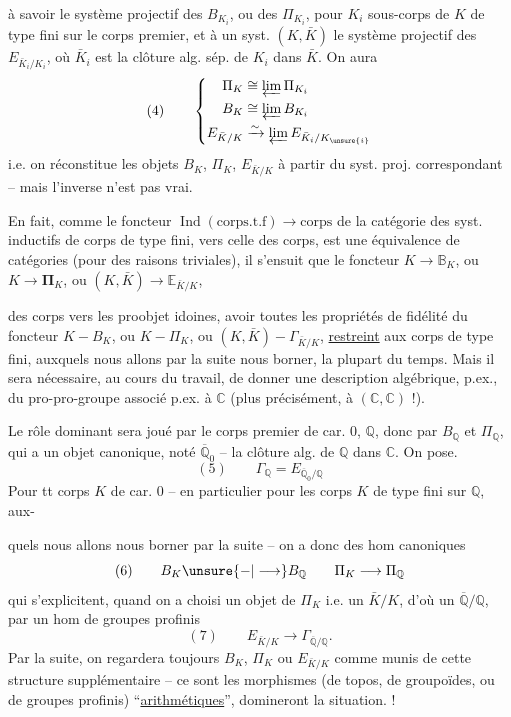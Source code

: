 à savoir le système projectif des $B_{K_i}$, ou des $\Pi_{K_i}$, pour $K_i$ sous-corps de $K$ de type fini sur le corps premier, et à un syst. $(K,\bar K)$ le système projectif des $E_{\bar K_i/K_i}$, où $\bar K_i$ est la clôture alg. sép. de $K_i$ dans $\bar K$. On aura
\[
(4)\qquad\left\{\begin{aligned}
\Pi_K&\cong\varprojlim\Pi_{K_i}\\
B_K&\cong\varprojlim B_{K_i}\\
E_{\bar K/K}&\xrightarrow{\sim}\varprojlim E_{\bar K_i/K_{\unsure{i}}}
\end{aligned}\right.
\]
i.e. on réconstitue les objets $B_K$, $\Pi_K$, $E_{\bar K/K}$ à partir du syst. proj. correspondant -- mais l'inverse n'est pas vrai.

En fait, comme le foncteur $\operatorname{Ind}(\text{corps.t.f})\longrightarrow\text{corps}$ de la catégorie des syst. inductifs de corps de type fini, vers celle des corps, est une équivalence de catégories (pour des raisons triviales), il s'ensuit que le foncteur $K\longrightarrow\mathbb{B}_K$, ou $K\longrightarrow\boldsymbol{\Pi}_K$, ou $(K,\bar K)\longrightarrow\mathbb{E}_{\bar K/K}$, 

des corps vers les proobjet idoines,  avoir toutes les propriétés de fidélité du foncteur $K-B_K$, ou $K-\Pi_K$, ou $(K,\bar K)-\Gamma_{\bar K/K}$, \uline{restreint} aux corps  de type fini, auxquels nous allons par la suite nous borner, la plupart du temps. Mais il sera nécessaire, au cours du travail, de donner une description  algébrique, p.ex., du pro-pro-groupe  associé p.ex. à $\mathbb C$ (plus précisément, à $(\mathbb C,\mathbb C)$ !).

Le rôle dominant sera joué par le corps premier de car. $0$, $\mathbb Q$, donc par $B_{\mathbb Q}$ et $\Pi_{\mathbb Q}$, qui a un objet canonique, noté $\overline{\mathbb Q}_0$ -- la clôture alg. de $\mathbb Q$ dans $\mathbb C$. On pose.
\[
(5)\qquad \Gamma_{\mathbb Q}=E_{\overline{\mathbb Q}_0/\mathbb Q}
\]
Pour tt corps $K$ de car. $0$ -- en particulier pour les corps $K$ de type fini sur $\mathbb Q$, aux-

quels nous allons nous borner par la suite -- on a donc des hom canoniques
\[
(6)\qquad B_K\unsure{-|\longrightarrow}B_{\mathbb Q}\qquad\Pi_K\longrightarrow\Pi_{\mathbb Q}
\]
qui s'explicitent, quand on a choisi un objet de $\Pi_K$ i.e. un $\bar K/K$, d'où un $\overline{\mathbb Q}/\mathbb Q$, par un hom de groupes profinis
\[
(7)\qquad E_{\bar K/K}\longrightarrow\Gamma_{\overline{\mathbb Q}/\mathbb Q}.
\]
Par la suite, on regardera toujours $B_K$, $\Pi_K$ ou $E_{\bar K/K}$ comme munis de cette structure supplémentaire -- ce sont les morphismes (de topos, de groupoïdes, ou de groupes profinis) ``\uline{arithmétiques}'', domineront la situation. !

